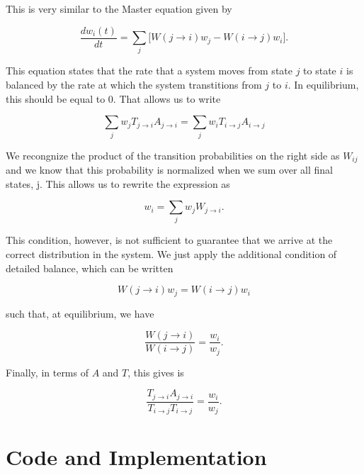 \documentclass[%
oneside,                 %
final,                   %
10pt]{article}
\begin{document}
This is very similar to the Master equation given by

\begin{equation*}
\frac{dw_i(t)}{dt}=\sum_j \lbrack W(j \rightarrow i) w_j - W(i \rightarrow j) w_i \rbrack.
\end{equation*}

This equation states that the rate that a system moves from state $j$ to state $i$ is balanced by the rate at which the system transtitions from $j$ to $i$.  In equilibrium, this should be equal to 0.  That allows us to write

\begin{equation*}
\sum_j w_j T_{j \rightarrow i}A_{j \rightarrow i} = \sum_j w_i T_{i \rightarrow j}A_{i \rightarrow j}
\end{equation*}

We recongnize the product of the transition probabilities on the right side as $W_{ij}$ and we know that this probability is normalized when we sum over all final states, j.  This allows us to rewrite the expression as

\begin{equation*}
w_i=\sum_j w_j W_{j \rightarrow i}.
\end{equation*}

This condition, however, is not sufficient to guarantee that we arrive at the correct distribution in the system.  We just apply the additional condition of detailed balance, which can be written

\begin{equation*}
W(j \rightarrow i)w_j = W(i \rightarrow j) w_i
\end{equation*}

such that, at equilibrium, we have

\begin{equation*}
\frac{W(j \rightarrow i)}{W(i \rightarrow j)}=\frac{w_i}{w_j}.
\end{equation*}

Finally, in terms of $A$ and $T$, this gives is

\begin{equation*}
\frac{T_{j \rightarrow i}A_{j \rightarrow i}}{T_{i \rightarrow j}T_{i \rightarrow j}}=\frac{w_i}{w_j}.
\end{equation*}


\section{Code and Implementation}
\end{document}
